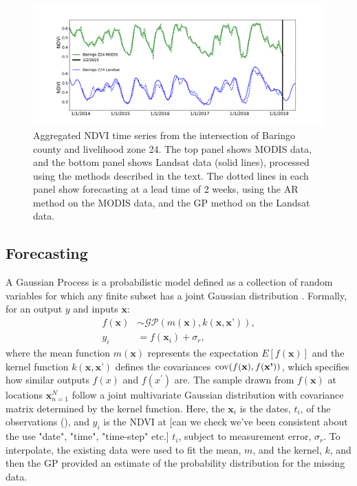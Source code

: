 \documentclass[review]{elsarticle}
\begin{document}
\begin{figure}
	\centering
	\includegraphics[trim = 50mm 0mm 0mm 0mm,width=14.5 cm]{figures/NDVI2.pdf} 
	\caption{Aggregated NDVI time series from the intersection of Baringo county and livelihood zone 24. The top panel shows MODIS data, and the bottom panel shows Landsat data (solid lines), processed using the methods described in the text. The dotted lines in each panel show forecasting at a lead time of 2 weeks, using the AR method on the MODIS data, and the GP method on the Landsat data.} \label{fig:ndvi_lk}
\end{figure}

\subsection{Forecasting}\label{forecast_method}

A Gaussian Process is a probabilistic model defined as a collection of random variables for which any finite subset has a joint Gaussian distribution \citep{gpm}. Formally, for an output $y$ and inputs $\textbf{x}$:
\begin{align}
	f(\textbf{x}) &\sim \mathcal{GP}(m(\textbf{x}), k(\textbf{x},\textbf{x'})),\\
	y_i &= f(\textbf{x}_i) + \sigma_r,
\end{align}
where the mean function $m(\textbf{x})$ represents the expectation $E[f(\textbf{x})]$ and the kernel function $k(\textbf{x}, \textbf{x'})$ defines the covariances ${\rm cov}(f(\textbf{x}), f(\textbf{x'}))$, which specifies how similar outputs $f(x)$ and $f(x^\prime)$ are. The sample drawn from $f(\textbf{x})$ at locations ${\textbf{x}}_{n=1}^N$ follow a joint multivariate Gaussian distribution with covariance matrix determined by the kernel function. Here, the $\textbf{x}_i$ is the dates, $t_i$, of the observations (), and $y_i$ is the NDVI at  {\color{red}[can we check we've been consistent about the use "date", "time", "time-step" etc.]} $t_i$, subject to measurement error, $\sigma_r$. To interpolate, the existing data were used to fit the mean, $m$, and the kernel, $k$, and then the GP %
provided an estimate of the probability distribution for the missing  data.
\end{document}
